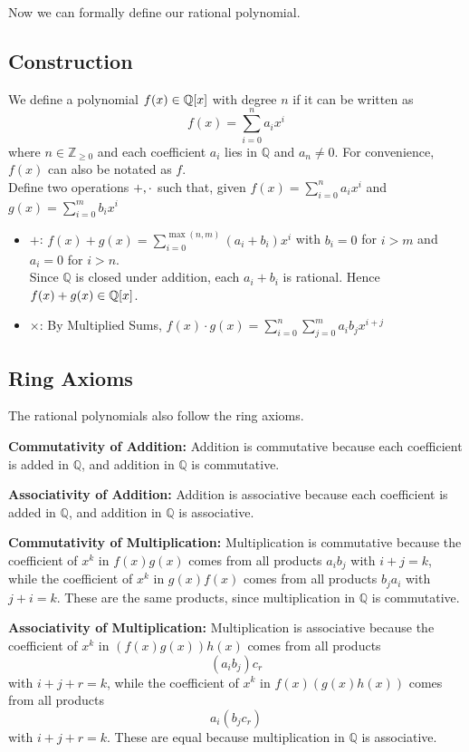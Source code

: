 Now we can formally define our rational polynomial.
\subsection{Construction}
\begin{definition}
We define a polynomial $f(x) \in \mathbb{Q}[x]$ with degree $n$ if it can be written as
\[
f(x)=\sum_{i=0}^{n} a_i x^i
\]
where $n\in\mathbb{Z}_{\geq0}$ and each coefficient $a_i$ lies in $\mathbb{Q}$ and $a_n \neq 0$. For convenience, $f(x)$ can also be notated as $f$.
\\ Define two operations $+, \cdot$ such that, given $f(x) = \sum_{i=0}^{n} a_i x^i$ and $g(x) = \sum_{i=0}^{m} b_i x^i $
\begin{itemize}
    \item $+$: $f(x) + g(x) = \sum_{i=0}^{\max(n,m)} (a_i +b_i)x^i$ with $b_i = 0$ for $i > m$ and $a_i = 0$ for $i > n$. \\
    Since $\mathbb{Q}$ is closed under addition, each
$a_i+b_i$ is rational. Hence $f(x)+g(x)\in\mathbb{Q}[x]$.
    \item $\times$: By Multiplied Sums, $f(x)\cdot g(x) = \sum_{i=0}^{n} \sum_{j=0}^{m} a_i b_j x^{i+j}$
\end{itemize}
\end{definition}

\subsection{Ring Axioms}
The rational polynomials also follow the ring axioms. 

\noindent\textbf{Commutativity of Addition: } 
Addition is commutative because each coefficient is added in
$\mathbb{Q}$, and addition in $\mathbb{Q}$ is commutative.


\noindent\textbf{Associativity of Addition: } 
Addition is associative because each coefficient is added in
$\mathbb{Q}$, and addition in $\mathbb{Q}$ is associative.

\noindent\textbf{Commutativity of Multiplication: }
Multiplication is commutative because the coefficient of $x^k$ in $f(x)g(x)$
comes from all products $a_i b_j$ with $i+j=k$, while the coefficient of $x^k$
in $g(x)f(x)$ comes from all products $b_j a_i$ with $j+i=k$. These are the
same products, since multiplication in $\mathbb{Q}$ is commutative.

\noindent\textbf{Associativity of Multiplication: }
Multiplication is associative because the coefficient of $x^k$ in
$(f(x)g(x))h(x)$ comes from all products
\[
(a_i b_j)c_r
\]
with $i+j+r=k$, while the coefficient of $x^k$ in $f(x)(g(x)h(x))$ comes from
all products
\[
a_i(b_j c_r)
\]
with $i+j+r=k$. These are equal because multiplication in $\mathbb{Q}$ is
associative.
 
